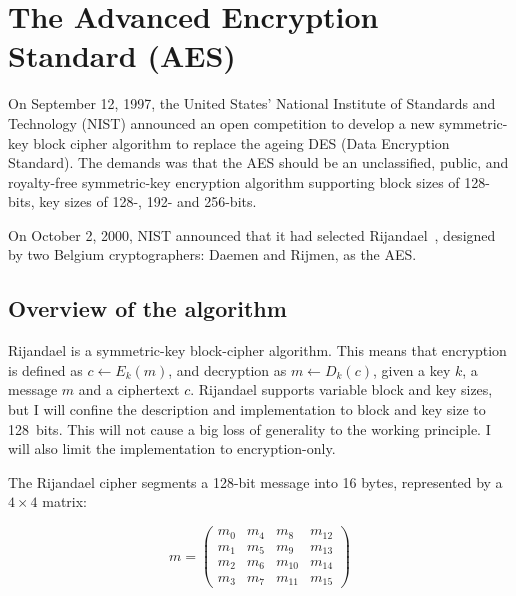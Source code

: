 \section{The Advanced Encryption Standard (AES)}

On September 12, 1997, the United States' National Institute of
Standards and Technology (NIST) announced an open competition to
develop a new symmetric-key block cipher algorithm to replace the
ageing DES (Data Encryption Standard). The demands was that the AES
should be an unclassified, public, and royalty-free symmetric-key
encryption algorithm supporting block sizes of 128-bits, key sizes of
128-, 192- and 256-bits.

On October 2, 2000, NIST announced that it had selected
Rijandael~\cite{rijandael}, designed by two Belgium cryptographers:
Daemen and Rijmen, as the AES.


\subsection{Overview of the algorithm}

Rijandael is a symmetric-key block-cipher algorithm. This means that
encryption is defined as $c \leftarrow E_k(m)$, and decryption as $m
\leftarrow D_k(c)$, given a key $k$, a message $m$ and a ciphertext
$c$. Rijandael supports variable block and key sizes, but I will
confine the description and implementation to block and key size to
128~bits. This will not cause a big loss of generality to the working
principle. I will also limit the implementation to encryption-only.

The Rijandael cipher segments a 128-bit message into 16 bytes,
represented by a $4 \times 4$ matrix:

\begin{equation}
  m = \begin{pmatrix}
    m_0 & m_4 & m_8 & m_{12} \\
    m_1 & m_5 & m_9 & m_{13} \\
    m_2 & m_6 & m_{10} & m_{14} \\
    m_3 & m_7 & m_{11} & m_{15}
    \end{pmatrix}
\end{equation}

